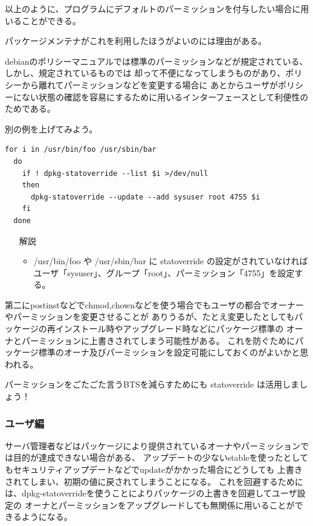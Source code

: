 \documentclass[mingoth,a4paper]{jsarticle}
\begin{document}
  以上のように、プログラムにデフォルトのパーミッションを付与したい場合に用いることができる。

  パッケージメンテナがこれを利用したほうがよいのには理由がある。

  debianのポリシーマニュアルでは標準のパーミッションなどが規定されている、しかし、規定されているものでは
  却って不便になってしまうものがあり、ポリシーから離れてパーミッションなどを変更する場合に
  あとからユーザがポリシーにない状態の確認を容易にするために用いるインターフェースとして利便性のためである。

  別の例を上げてみよう。

  \begin{Verbatim}[frame=single]
  for i in /usr/bin/foo /usr/sbin/bar
  do
    if ! dpkg-statoverride --list $i >/dev/null
    then
      dpkg-statoverride --update --add sysuser root 4755 $i
    fi
  done
  \end{Verbatim}

  \begin{itemize}
    \item [解説] 
    \begin{itemize}
      \item /usr/bin/foo や /usr/sbin/bar に statoverride の設定がされていなければ
            ユーザ「sysuser」、グループ「root」、パーミッション「4755」を設定する。
    \end{itemize}
  \end{itemize}

  第二にpostinstなどでchmod,chownなどを使う場合でもユーザの都合でオーナーやパーミッションを変更させることが
  ありうるが、たとえ変更したとしてもパッケージの再インストール時やアップグレード時などにパッケージ標準の
  オーナとパーミッションに上書きされてしまう可能性がある。
  これを防ぐためにパッケージ標準のオーナ及びパーミッションを設定可能にしておくのがよいかと思われる。

  パーミッションをごたごた言うBTSを減らすためにも statoverride は活用しましょう！

  \subsubsection{ユーザ編}

  サーバ管理者などはパッケージにより提供されているオーナやパーミッションでは目的が達成できない場合がある、
  アップデートの少ないstableを使ったとしてもセキュリティアップデートなどでupdateがかかった場合にどうしても
  上書きされてしまい、初期の値に戻されてしまうことになる。
  これを回避するためには、dpkg-statoverrideを使うことによりパッケージの上書きを回避してユーザ設定の
  オーナとパーミッションをアップグレードしても無関係に用いることができるようになる。
  
\end{document}
